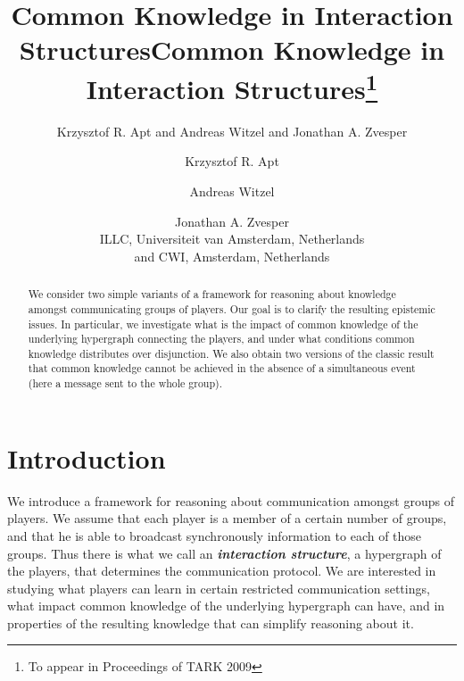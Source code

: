 \documentclass{article}
\title{Common Knowledge in Interaction Structures}
\author{Krzysztof R. Apt and Andreas Witzel and Jonathan A. Zvesper}
\title{Common Knowledge in Interaction Structures\footnote{To appear in Proceedings of TARK 2009}}
\author{Krzysztof R. Apt
\and
Andreas Witzel
\and
Jonathan A. Zvesper
\\[2ex]
ILLC, Universiteit van Amsterdam, Netherlands \\
and CWI, Amsterdam, Netherlands
}
\newcounter{#1}
\newcommand{\dfn}[1]{\emph{\bfseries #1}}
\begin{document}
\maketitle
\sloppy

\begin{abstract}
  We consider two simple variants of a framework
  for reasoning about knowledge amongst communicating groups of players.
  Our goal is to clarify the resulting epistemic issues.
  In particular, we investigate what is the impact of common knowledge of the
  underlying hypergraph connecting the players, and under what conditions
  common knowledge distributes over disjunction.
  We also obtain two versions of the classic result that common knowledge cannot be
  achieved in the absence of a simultaneous event
  (here a message sent to the whole group).
\end{abstract}

\section{Introduction}
\label{sec:intro}

We introduce a framework for reasoning about communication amongst groups of players.
We assume that each player is a member of a certain number of groups, and that he is able to broadcast
synchronously information to each of those groups.
Thus there is what we call an \dfn{interaction structure}, a hypergraph of the players, that determines the
communication protocol.
We are interested in studying what players can learn in certain restricted communication settings,
what impact common knowledge of the underlying hypergraph can have,
and in properties of the resulting knowledge that can simplify reasoning about it.
\end{document}
